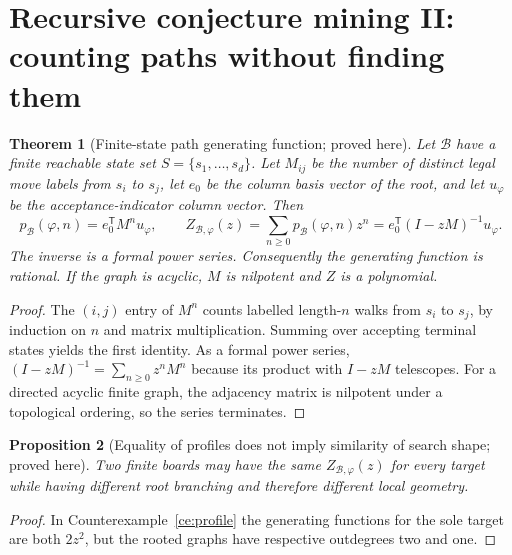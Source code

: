 \documentclass[11pt,letterpaper]{article}
\newtheorem{theorem}{Theorem}[section]
\newtheorem{proposition}[theorem]{Proposition}
\theoremstyle{definition}
\newcommand{\B}{\mathcal B}
\begin{document}
\section{Recursive conjecture mining II: counting paths without finding them}
\begin{theorem}[Finite-state path generating function; proved here]\label{thm:matrix}
Let $\B$ have a finite reachable state set $S=\{s_1,\ldots,s_d\}$. Let $M_{ij}$ be the number of distinct legal move labels from $s_i$ to $s_j$, let $e_0$ be the column basis vector of the root, and let $u_\varphi$ be the acceptance-indicator column vector. Then
\[
\boxed{p_\B(\varphi,n)=e_0^{\mathsf T}M^n u_\varphi,\qquad
Z_{\B,\varphi}(z)=\sum_{n\ge0}p_\B(\varphi,n)z^n
=e_0^{\mathsf T}(I-zM)^{-1}u_\varphi.}
\]
The inverse is a formal power series. Consequently the generating function is rational. If the graph is acyclic, $M$ is nilpotent and $Z$ is a polynomial.
\end{theorem}
\begin{proof}
The $(i,j)$ entry of $M^n$ counts labelled length-$n$ walks from $s_i$ to $s_j$, by induction on $n$ and matrix multiplication. Summing over accepting terminal states yields the first identity. As a formal power series, $(I-zM)^{-1}=\sum_{n\ge0}z^nM^n$ because its product with $I-zM$ telescopes. For a directed acyclic finite graph, the adjacency matrix is nilpotent under a topological ordering, so the series terminates.
\end{proof}
\begin{proposition}[Equality of profiles does not imply similarity of search shape; proved here]
Two finite boards may have the same $Z_{\B,\varphi}(z)$ for every target while having different root branching and therefore different local geometry.
\end{proposition}
\begin{proof}
In Counterexample~\ref{ce:profile} the generating functions for the sole target are both $2z^2$, but the rooted graphs have respective outdegrees two and one.
\end{proof}
\end{document}
